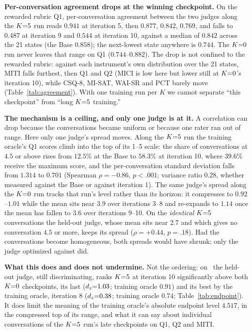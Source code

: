 \textbf{Per-conversation agreement drops at the winning checkpoint.} On the rewarded rubric
Q1, per-conversation agreement between the two judges along the $K{=}5$ run reads $0.941$ at
iteration 5, then $0.877$, $0.842$, $0.769$, and falls to $\mathbf{0.487}$ at iteration 9 and
$\mathbf{0.544}$ at iteration 10, against a median of $0.842$ across the 21 states (the Base
$0.858$); the next-lowest state anywhere is $0.744$. The $K{=}0$ run never leaves that range on Q1
($0.744$--$0.882$). The drop is not confined to the rewarded rubric: against each
instrument's own distribution over the 21 states, MITI falls furthest, then Q1 and Q2 (MICI is low here but lower still at $K{=}0$'s iteration 10),
while CSQ-8, MI-SAT, WAI-SR and PCT barely move (Table~\ref{tab:agreement}).
With one training run per $K$ we cannot separate ``this checkpoint'' from ``long $K{=}5$
training.''

\textbf{The mechanism is a ceiling, and only one judge is at it.} A correlation can drop
because the conversations became uniform or because one rater ran out of range. Here only one
judge's spread moves. Along the $K{=}5$ run the training oracle's Q1 scores climb into the top of
its 1--5 scale: the share of conversations at $4.5$ or above rises from $12.5\%$ at the Base to
$58.3\%$ at iteration 10, where $39.6\%$ receive the maximum score, and the per-conversation
standard deviation falls from $1.314$ to $0.701$ (Spearman $\rho = -0.86$, $p < .001$; variance
ratio $0.28$, whether measured against the Base or against iteration 1). The same judge's spread
along the $K{=}0$ run tracks that run's level rather than its horizon: it compresses to
$0.92$--$1.01$ while the mean sits near $3.9$ over iterations 3--8 and re-expands to $1.14$ once
the mean has fallen to $3.6$ over iterations 9--10. On the \emph{identical} $K{=}5$ conversations the
held-out judge, whose mean sits near $2.7$ and which gives no conversation $4.5$ or more, keeps its
spread ($\rho = +0.44$, $p = .18$). Had the conversations become homogeneous, both spreads would
have shrunk; only the judge optimized against did.

\textbf{What this does and does not undermine.} Not the ordering: on \QQ\ the held-out judge,
still discriminating, ranks $K{=}5$ at iteration 10 significantly above both $K{=}0$ checkpoints, its
last ($d_z{=}1.03$; training oracle $0.91$) and its best by the training oracle, iteration 8 ($d_z{=}0.38$; training
oracle $0.74$; Table~\ref{tab:endpoint}). It does limit the meaning of the training oracle's
absolute endpoint level $4.517$, in the compressed top of its range, and what it can say about
individual conversations of the $K{=}5$ run's late checkpoints on Q1, Q2 and MITI.
